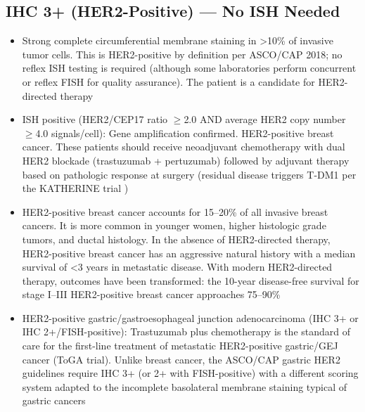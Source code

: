\subsection*{IHC 3+ (HER2-Positive) --- No ISH Needed}
\begin{itemize}
  \item Strong complete circumferential membrane staining in >10\% of invasive tumor cells. This is HER2-positive by definition per ASCO/CAP 2018; no reflex ISH testing is required (although some laboratories perform concurrent or reflex FISH for quality assurance). The patient is a candidate for HER2-directed therapy
  \item ISH positive (HER2/CEP17 ratio $\geq$2.0 AND average HER2 copy number $\geq$4.0 signals/cell): Gene amplification confirmed. HER2-positive breast cancer. These patients should receive neoadjuvant chemotherapy with dual HER2 blockade (trastuzumab + pertuzumab) followed by adjuvant therapy based on pathologic response at surgery (residual disease triggers T-DM1 per the KATHERINE trial \cite{vonminckwitz2019trastuzumab})
  \item HER2-positive breast cancer accounts for 15--20\% of all invasive breast cancers. It is more common in younger women, higher histologic grade tumors, and ductal histology. In the absence of HER2-directed therapy, HER2-positive breast cancer has an aggressive natural history with a median survival of <3 years in metastatic disease. With modern HER2-directed therapy, outcomes have been transformed: the 10-year disease-free survival for stage I--III HER2-positive breast cancer approaches 75--90\%
  \item HER2-positive gastric/gastroesophageal junction adenocarcinoma (IHC 3+ or IHC 2+/FISH-positive): Trastuzumab plus chemotherapy is the standard of care for the first-line treatment of metastatic HER2-positive gastric/GEJ cancer (ToGA trial). Unlike breast cancer, the ASCO/CAP gastric HER2 guidelines require IHC 3+ (or 2+ with FISH-positive) with a different scoring system adapted to the incomplete basolateral membrane staining typical of gastric cancers
\end{itemize}

